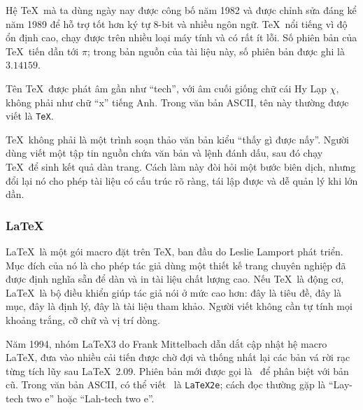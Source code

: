 \documentclass[11pt]{article}
\begin{document}
Hệ \TeX\ mà ta dùng ngày nay được công bố năm 1982 và được chỉnh sửa đáng kể
năm 1989 để hỗ trợ tốt hơn ký tự 8-bit và nhiều ngôn ngữ. \TeX\ nổi tiếng vì
độ ổn định cao, chạy được trên nhiều loại máy tính và có rất ít lỗi. Số phiên
bản của \TeX\ tiến dần tới \(\pi\); trong bản nguồn của tài liệu này, số phiên
bản được ghi là \(3.14159\).

Tên \TeX\ được phát âm gần như ``tech'', với âm cuối giống chữ cái Hy Lạp
\(\chi\), không phải như chữ ``x'' tiếng Anh. Trong văn bản ASCII, tên này
thường được viết là \texttt{TeX}.

\TeX\ không phải là một trình soạn thảo văn bản kiểu ``thấy gì được nấy''.
Người dùng viết một tập tin nguồn chứa văn bản và lệnh đánh dấu, sau đó chạy
\TeX\ để sinh kết quả dàn trang. Cách làm này đòi hỏi một bước biên dịch, nhưng
đổi lại nó cho phép tài liệu có cấu trúc rõ ràng, tái lập được và dễ quản lý
khi lớn dần.

\subsubsection{\LaTeX}

\LaTeX\ là một gói macro đặt trên \TeX, ban đầu do Leslie Lamport phát triển.
Mục đích của nó là cho phép tác giả dùng một thiết kế trang chuyên nghiệp đã
được định nghĩa sẵn để dàn và in tài liệu chất lượng cao. Nếu \TeX\ là động cơ,
\LaTeX\ là bộ điều khiển giúp tác giả nói ở mức cao hơn: đây là tiêu đề, đây
là mục, đây là định lý, đây là tài liệu tham khảo. Người viết không cần tự tính
mọi khoảng trắng, cỡ chữ và vị trí dòng.

Năm 1994, nhóm \LaTeX3 do Frank Mittelbach dẫn dắt cập nhật hệ macro \LaTeX,
đưa vào nhiều cải tiến được chờ đợi và thống nhất lại các bản vá rời rạc từng
tích lũy sau \LaTeX~2.09. Phiên bản mới được gọi là \LaTeXe\ để phân biệt với
bản cũ. Trong văn bản ASCII, có thể viết \LaTeXe\ là \texttt{LaTeX2e}; cách
đọc thường gặp là ``Lay-tech two e'' hoặc ``Lah-tech two e''.
\end{document}
